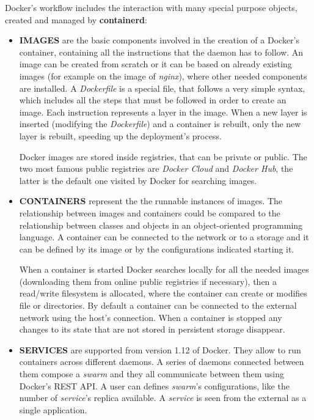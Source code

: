 \documentclass[a4paper,12pt]{article}
\begin{document}
Docker's workflow includes the interaction with many special purpose objects,
created and managed by \textbf{containerd}:
\begin{itemize}
  \item \textbf{IMAGES} are the basic components involved in the creation of a
  Docker's container, containing all the instructions that the daemon has to
  follow. An image can be created from scratch or it can be based on already
  existing images (for example on the image of \textit{nginx}), where other
  needed components are installed. A \textit{Dockerfile} is a special file, that
  follows a very simple syntax, which includes all the steps that must be
  followed in order to create an image. Each instruction represents a layer in
  the image. When a new layer is inserted (modifying the \textit{Dockerfile})
  and a container is rebuilt, only the new layer is rebuilt, speeding up the
  deployment's process.\par Docker images are stored inside registries, that can
  be private or public. The two most famous public registries are \textit{Docker
  Cloud} and \textit{Docker Hub}, the latter is the default one visited by
  Docker for searching images.   
  \item \textbf{CONTAINERS} represent the the runnable instances of images.
  The relationship between images and containers could be compared to the
  relationship between classes and objects in an object-oriented programming
  language. A container can be connected to the network or to a storage and it
  can be defined by its image or by the configurations indicated starting
  it.\par When a container is started Docker searches locally for all the needed
  images (downloading them from online public registries if necessary), then a
  read/write filesystem is allocated, where the container can create or modifies
  file or directories. By default a container can be connected to the external
  network using the host's connection. When a container is stopped  any changes
  to its state that are not stored in persistent storage disappear.
  \item \textbf{SERVICES} are supported from version 1.12 of Docker. They allow
  to run containers across different daemons. A series of daemons connected
  between them compose a \textit{swarm} and they all communicate between them
  using Docker's REST API. A user can defines \textit{swarm}'s configurations,
  like the number of \textit{service}'s replica available. A \textit{service} is
  seen from the external as a single application.
\end{itemize}   
\end{document}
